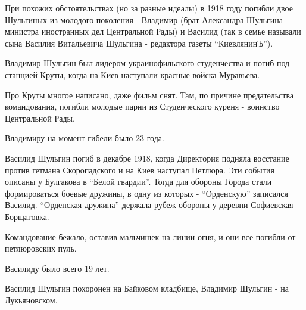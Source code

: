 При похожих обстоятельствах (но за разные идеалы) в 1918 году погибли двое
Шульгиных из молодого поколения - Владимир (брат Александра Шульгина - министра
иностранных дел Центральной Рады) и Василид (так в семье называли сына Василия
Витальевича Шульгина - редактора газеты \enquote{КиевлянинЪ}).


Владимир Шульгин был лидером украинофильского студенчества и погиб под станцией
Круты, когда на Киев наступали красные войска Муравьева.

Про Круты многое написано, даже фильм снят. Там, по причине предательства
командования, погибли молодые парни из Студенческого куреня - воинство
Центральной Рады.

Владимиру на момент гибели было 23 года.


Василид Шульгин погиб в декабре 1918, когда Директория подняла восстание против
гетмана Скоропадского и на Киев наступал Петлюра. Эти события описаны у
Булгакова в \enquote{Белой гвардии}. Тогда для обороны Города стали формироваться
боевые дружины, в одну из которых - \enquote{Орденскую} записался Василид. \enquote{Орденская
дружина} держала рубеж обороны у деревни Софиевская Борщаговка.

Командование бежало, оставив мальчишек на линии огня, и они все погибли от
петлюровских пуль.

Василиду было всего 19 лет.

Василид Шульгин похоронен на Байковом кладбище, Владимир Шульгин - на
Лукьяновском.

